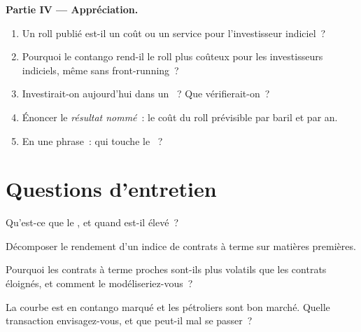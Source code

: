 \begin{problem}
\medskip\noindent\textbf{Partie IV --- Appréciation.}
\begin{enumerate}[resume]
\item Un roll publié est-il un coût ou un service pour l'investisseur indiciel~?
\item Pourquoi le contango rend-il le roll plus coûteux pour les investisseurs indiciels, même sans front-running~?
\item Investirait-on aujourd'hui dans un ~? Que vérifierait-on~?
\item Énoncer le \emph{résultat nommé}~: le coût du roll prévisible par baril et par an.
\item En une phrase~: qui touche le ~?
\end{enumerate}
\end{problem}

\section{Questions d'entretien}

\begin{interviewq}\label{iq:m3:forward-curves-storage-and-convenience-yield:1}
Qu'est-ce que le , et quand est-il élevé~?
\end{interviewq}

\begin{interviewq}\label{iq:m3:forward-curves-storage-and-convenience-yield:2}
Décomposer le rendement d'un indice de contrats à terme sur matières premières.
\end{interviewq}

\begin{interviewq}\label{iq:m3:forward-curves-storage-and-convenience-yield:3}
Pourquoi les contrats à terme proches sont-ils plus volatils que les contrats éloignés, et comment le modéliseriez-vous~?
\end{interviewq}

\begin{interviewq}\label{iq:m3:forward-curves-storage-and-convenience-yield:4}
La courbe est en contango marqué et les pétroliers sont bon marché. Quelle transaction envisagez-vous, et que peut-il mal se passer~?
\end{interviewq}

